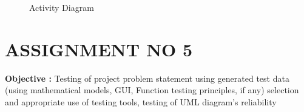 \documentclass[oneside,a4paper,12pt]{report}
\begin{document}
{\begin{appendices}
\begin{center}
	\begin{figure}[H]
		\centering
	  \caption{Activity Diagram}
	  \label{fig:state-dig}
	\end{figure}
\end{center} 


\pagebreak
\section{ASSIGNMENT NO 5}

\textbf{Objective : }Testing of project problem statement using generated test data (using mathematical models, GUI, Function testing principles, if any) selection and appropriate use of testing tools, testing of UML diagram’s reliability  \\


\end{appendices}}
\end{document}
